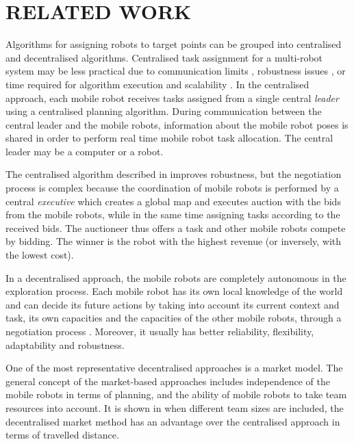\section{RELATED WORK}

Algorithms for assigning robots to target points can be grouped into centralised and decentralised algorithms. 
Centralised task assignment for a multi-robot system may be less practical due to communication limits \cite{Dias2000}, robustness issues \cite{Dias2006}, or time required for algorithm execution and scalability \cite{Julia2012}. In the centralised approach, each mobile robot receives tasks assigned from a single central \emph{leader} using a centralised planning algorithm. During communication between the central leader and the mobile robots, information about the mobile robot poses is shared in order to perform real time mobile robot task allocation. The central leader may be a computer or a robot.

The centralised algorithm described in \cite{Burgard2005} improves robustness, but the negotiation process is complex because the coordination of mobile robots is performed by a central \emph{executive} which creates a global map and executes auction with the  bids from the mobile robots, while in the same time assigning tasks according to the received bids. The auctioneer thus offers a task and other mobile robots compete by bidding. The winner is the robot with the highest revenue (or inversely, with the lowest cost).

In a decentralised approach, the mobile robots are completely autonomous in the exploration process. Each mobile robot has its own local knowledge of the world and can decide its future actions by taking into account its current context and task, its own capacities and the capacities of the other mobile robots, through a negotiation process \cite{Yan2013}. Moreover, it usually has better reliability, flexibility, adaptability and robustness. 

One of the most representative decentralised approaches is a market model.
The general concept of the market-based approaches includes independence of the mobile robots in terms of planning, and the ability of mobile robots to take team resources into account. It is shown in \cite{Dias2003} when different team sizes are included, the decentralised market method has an advantage over the centralised approach in terms of travelled distance.

